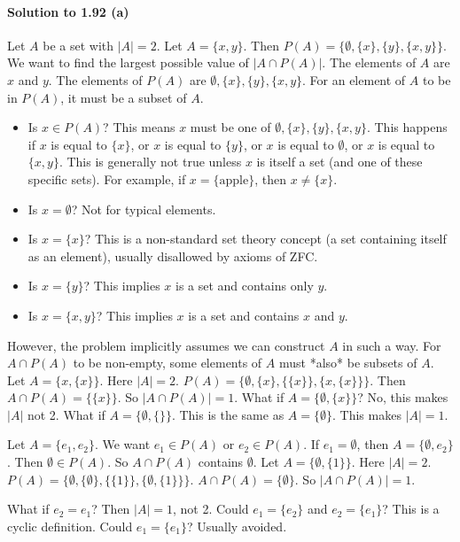 \documentclass{article}
\begin{document}
\begin{itemize}
\begin{itemize}
\begin{itemize}
\paragraph*{Solution to 1.92 (a)}
Let $A$ be a set with $|A| = 2$. Let $A = \{x, y\}$.
Then $P(A) = \{\emptyset, \{x\}, \{y\}, \{x, y\}\}$.
We want to find the largest possible value of $|A \cap P(A)|$.
The elements of $A$ are $x$ and $y$.
The elements of $P(A)$ are $\emptyset, \{x\}, \{y\}, \{x, y\}$.
For an element of $A$ to be in $P(A)$, it must be a subset of $A$.
\begin{itemize}
    \item Is $x \in P(A)$? This means $x$ must be one of $\emptyset, \{x\}, \{y\}, \{x, y\}$. This happens if $x$ is equal to $\{x\}$, or $x$ is equal to $\{y\}$, or $x$ is equal to $\emptyset$, or $x$ is equal to $\{x,y\}$. This is generally not true unless $x$ is itself a set (and one of these specific sets). For example, if $x=\{\text{apple}\}$, then $x \ne \{x\}$.
    \item Is $x = \emptyset$? Not for typical elements.
    \item Is $x = \{x\}$? This is a non-standard set theory concept (a set containing itself as an element), usually disallowed by axioms of ZFC.
    \item Is $x = \{y\}$? This implies $x$ is a set and contains only $y$.
    \item Is $x = \{x, y\}$? This implies $x$ is a set and contains $x$ and $y$.
\end{itemize}
However, the problem implicitly assumes we can construct $A$ in such a way. For $A \cap P(A)$ to be non-empty, some elements of $A$ must *also* be subsets of $A$.
Let $A = \{x, \{x\}\}$. Here $|A|=2$.
$P(A) = \{\emptyset, \{x\}, \{\{x\}\}, \{x, \{x\}\}\}$.
Then $A \cap P(A) = \{\{x\}\}$. So $|A \cap P(A)| = 1$.
What if $A = \{\emptyset, \{x\}\}$? No, this makes $|A|$ not 2.
What if $A = \{\emptyset, \{ \}\}$. This is the same as $A = \{\emptyset\}$. This makes $|A|=1$.

Let $A = \{e_1, e_2\}$. We want $e_1 \in P(A)$ or $e_2 \in P(A)$.
If $e_1 = \emptyset$, then $A = \{\emptyset, e_2\}$. Then $\emptyset \in P(A)$. So $A \cap P(A)$ contains $\emptyset$.
Let $A = \{\emptyset, \{1\}\}$. Here $|A|=2$.
$P(A) = \{\emptyset, \{\emptyset\}, \{\{1\}\}, \{\emptyset, \{1\}\}\}$.
$A \cap P(A) = \{\emptyset\}$. So $|A \cap P(A)| = 1$.

What if $e_2 = e_1$? Then $|A|=1$, not 2.
Could $e_1 = \{e_2\}$ and $e_2 = \{e_1\}$? This is a cyclic definition.
Could $e_1 = \{e_1\}$? Usually avoided.


\end{itemize}
\end{itemize}
\end{itemize}
\end{document}
